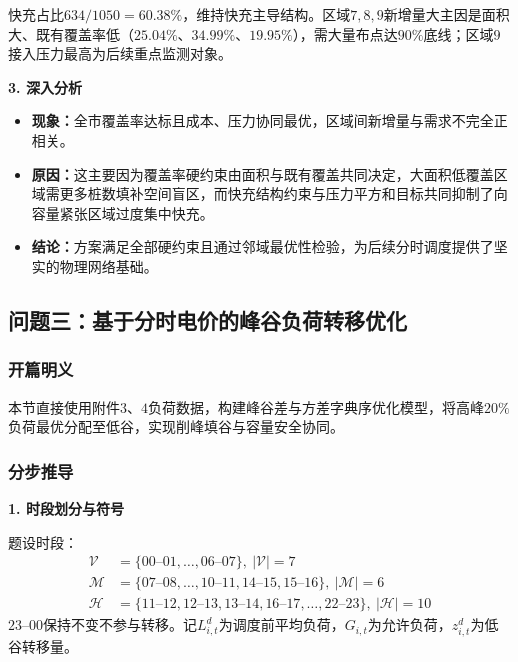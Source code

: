 \documentclass[a4paper,12pt]{ctexart}
\begin{document}
快充占比$634/1050=60.38\%$，维持快充主导结构。区域$7,8,9$新增量大主因是面积大、既有覆盖率低（$25.04\%$、$34.99\%$、$19.95\%$），需大量布点达$90\%$底线；区域$9$接入压力最高为后续重点监测对象。


\textbf{3. 深入分析}
\begin{itemize}
\item \textbf{现象：}全市覆盖率达标且成本、压力协同最优，区域间新增量与需求不完全正相关。
\item \textbf{原因：}这主要因为覆盖率硬约束由面积与既有覆盖共同决定，大面积低覆盖区域需更多桩数填补空间盲区，而快充结构约束与压力平方和目标共同抑制了向容量紧张区域过度集中快充。
\item \textbf{结论：}方案满足全部硬约束且通过邻域最优性检验，为后续分时调度提供了坚实的物理网络基础。
\end{itemize}

\subsection{问题三：基于分时电价的峰谷负荷转移优化}

\subsubsection{开篇明义}
本节直接使用附件$3$、$4$负荷数据，构建峰谷差与方差字典序优化模型，将高峰$20\%$负荷最优分配至低谷，实现削峰填谷与容量安全协同。

\subsubsection{分步推导}

\textbf{1. 时段划分与符号}

题设时段：
\begin{equation}
\begin{aligned}
\mathcal{V}&=\{00\text{--}01,\ldots,06\text{--}07\},\ |\mathcal{V}|=7\\
\mathcal{M}&=\{07\text{--}08,\ldots,10\text{--}11,14\text{--}15,15\text{--}16\},\ |\mathcal{M}|=6\\
\mathcal{H}&=\{11\text{--}12,12\text{--}13,13\text{--}14,16\text{--}17,\ldots,22\text{--}23\},\ |\mathcal{H}|=10
\end{aligned}\tag{3-1}
\end{equation}
$23\text{--}00$保持不变不参与转移。记$L_{i,t}^{d}$为调度前平均负荷，$G_{i,t}$为允许负荷，$z_{i,t}^{d}$为低谷转移量。
\end{document}
